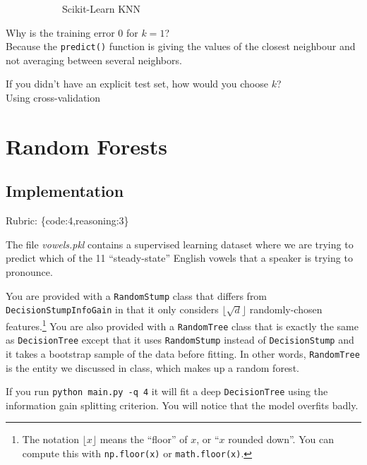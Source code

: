 \documentclass{article}
\def\rubric#1{\gre{Rubric: \{#1\}}}{}
\def\gre#1{{\color{gre}#1}}
\def\ans#1{{\color{ans}#1}}
\begin{document}
{{\begin{figure}[htp]
\begin{subfigure}[b]{0.5\textwidth}
{\begin{center}
            Scikit-Learn KNN
          \end{center}
      }
     \label{fig:2}
   \end{subfigure}
\end{figure}
\clearpage
\item Why is the training error $0$ for $k=1$? \\
\ans{
   Because the \texttt{predict()} function is giving the values of the closest neighbour and not 
   averaging between several neighbors.
}
\item If you didn't have an explicit test set, how would you choose $k$? \\
\ans{
   Using cross-validation
}
}}


\section{Random Forests}

\subsection{Implementation}
\rubric{code:4,reasoning:3}

The file \emph{vowels.pkl} contains a supervised learning dataset where we are trying to predict which of the 11 ``steady-state'' English vowels that a speaker is trying to pronounce.

You are provided with a \texttt{RandomStump} class that differs from
\texttt{DecisionStumpInfoGain} in that
it only considers $\lfloor \sqrt{d} \rfloor$ randomly-chosen features.\footnote{The notation $\lfloor x\rfloor$ means the ``floor'' of $x$, or ``$x$ rounded down''. You can compute this with \texttt{np.floor(x)} or \texttt{math.floor(x)}.}
You are also provided with a \texttt{RandomTree} class that is exactly the same as
\texttt{DecisionTree} except that it uses \texttt{RandomStump} instead of
\texttt{DecisionStump} and it takes a bootstrap sample of the data before fitting.
In other words, \texttt{RandomTree} is the entity we discussed in class, which
makes up a random forest.

If you run \texttt{python main.py -q 4} it will fit a deep \texttt{DecisionTree}
using the information gain splitting criterion. You will notice that the model overfits badly.
\end{document}
